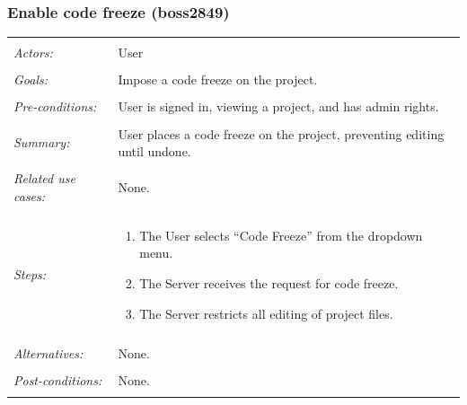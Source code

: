 \documentclass[11pt]{article}
\begin{document}
\subsubsection{Enable code freeze (boss2849)}
\begin{tabular}{ p{2cm} p{12cm} }
 \hline
 \\
 \textit{Actors:} & User \\ 
 \\
 \textit{Goals:} & Impose a code freeze on the project. \\
 \\
 \textit{Pre-conditions:} & User is signed in, viewing a project, and has admin rights.\\
 \\
 \textit{Summary:} & User places a code freeze on the project, preventing editing until undone. \\
 \\
 \textit{Related use cases:} & None. \\ 
 \\
 \textit{Steps:} & \begin{enumerate}
  \item The User selects ``Code Freeze'' from the dropdown menu.
  \item The Server receives the request for code freeze.
  \item The Server restricts all editing of project files.
 \end{enumerate} \\
 \\
 \textit{Alternatives:} & None. \\
 \\
 \textit{Post-conditions:} & None. \\
 \\
\hline
\end{tabular}
\end{document}
